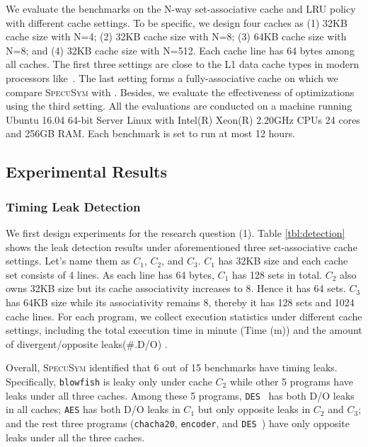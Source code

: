\documentclass[sigconf]{acmart}
\newcommand{\SpecuSym}{\textsc{SpecuSym} }
\begin{document}
We evaluate the benchmarks on the N-way set-associative cache and LRU 
policy with different cache settings. To be specific, we design four 
caches as (1) 32KB cache size with N=4; (2) 32KB cache size with N=8; (3) 
64KB cache size with N=8; and (4) 32KB cache size with N=512. Each cache 
line has 64 bytes among all caches. The first three settings are close to 
the L1 data cache types in modern processors like~\cite{Skylake,Kabylake}. 
The last setting forms a fully-associative cache on which we compare 
\SpecuSym with \cite{WuW19}. Besides, we evaluate the effectiveness of 
optimizations using the third setting. All the evaluations are conducted 
on a machine running Ubuntu 16.04 64-bit Server Linux with Intel(R) Xeon(R) 
2.20GHz CPUs 24 cores and 256GB RAM. Each benchmark is set to run at 
most 12 hours.


\subsection{Experimental Results}
\label{sec:experiments}

\subsubsection{Timing Leak Detection}
\label{sec:leak_detect}




We first design experiments for the research question (1). Table
\ref{tbl:detection} shows the leak detection results under aforementioned 
three set-associative cache settings. Let's name them as {$C_1$}, $C_2$, 
and $C_3$. $C_1$ has 32KB size and each cache set consists of 4 lines. 
As each line has 64 bytes, $C_1$ has 128 sets in total. $C_2$ also owns 
32KB size but its cache associativity increases to 8. Hence it has 64 
sets. $C_3$ has 64KB size while its associativity remains 8, thereby it
has 128 sets and 1024 cache lines. For each program, we collect execution 
statistics under different cache settings, including the total execution 
time in minute (Time (m)) and the amount of divergent/opposite leaks(\#.D/O) . 





Overall, \SpecuSym identified that 6 out of 15 benchmarks have timing 
leaks. Specifically, \texttt{blowfish} is leaky only under cache $C_2$ 
while other 5 programs have leaks under all three caches. Among these 
5 programs, \texttt{DES}~\cite{glibc} has both D/O leaks in all caches; 
\texttt{AES} has both D/O leaks in $C_1$ but only opposite leaks in $C_2$ 
and $C_3$; and the rest three programs (\texttt{chacha20}, \texttt{encoder}, 
and \texttt{DES}~\cite{OpenSSL111c}) have only opposite leaks under all 
the three caches.
\end{document}
